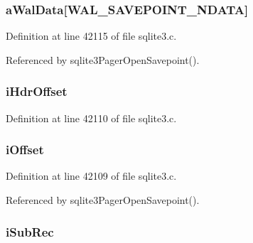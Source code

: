\subsubsection[{a\+Wal\+Data}]{ a\+Wal\+Data\mbox{[}{\bf W\+A\+L\+\_\+\+S\+A\+V\+E\+P\+O\+I\+N\+T\+\_\+\+N\+D\+A\+T\+A}\mbox{]}}\label{struct_pager_savepoint_aa642cbaf7f0a3ab1250d603e7a713516}


Definition at line 42115 of file sqlite3.\+c.



Referenced by sqlite3\+Pager\+Open\+Savepoint().

\hypertarget{struct_pager_savepoint_a1fe600717a168ef1f6a91ec450ac63bb}{}
\subsubsection[{i\+Hdr\+Offset}]{ i\+Hdr\+Offset}\label{struct_pager_savepoint_a1fe600717a168ef1f6a91ec450ac63bb}


Definition at line 42110 of file sqlite3.\+c.

\hypertarget{struct_pager_savepoint_a5847134335c04ff468319a20ca90c194}{}
\subsubsection[{i\+Offset}]{ i\+Offset}\label{struct_pager_savepoint_a5847134335c04ff468319a20ca90c194}


Definition at line 42109 of file sqlite3.\+c.



Referenced by sqlite3\+Pager\+Open\+Savepoint().

\hypertarget{struct_pager_savepoint_acb7e9617ad1b26a76b4d83f2216665d8}{}
\subsubsection[{i\+Sub\+Rec}]{ i\+Sub\+Rec}\label{struct_pager_savepoint_acb7e9617ad1b26a76b4d83f2216665d8}


